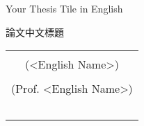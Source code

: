 \thispagestyle{empty}

\vspace{5mm}
\centerline{}
\vspace{5mm}
\centerline{}
\vspace{5mm}
\centerline{}

\vspace{30mm}

\centerline{
\LARGE 
{Your Thesis Tile in English}
}

\vspace{10mm}

\centerline{
\LARGE
{論文中文標題}
}

\vspace{70mm}

\begin{tabular}{c}
\\
\\
\centerline{\large \fontsize{16pt}{\baselineskip}{研究生：<中文名>}(<English Name>)}
\\
\\
\centerline{\large \fontsize{16pt}{\baselineskip}{指導教授：<中文名> 教授}(Prof. <English Name>)}
\\
\\
\\
\\
\\
\centerline{\fontsize{16pt}{\baselineskip}{中華民國一零三年六月}}
\end{tabular}
